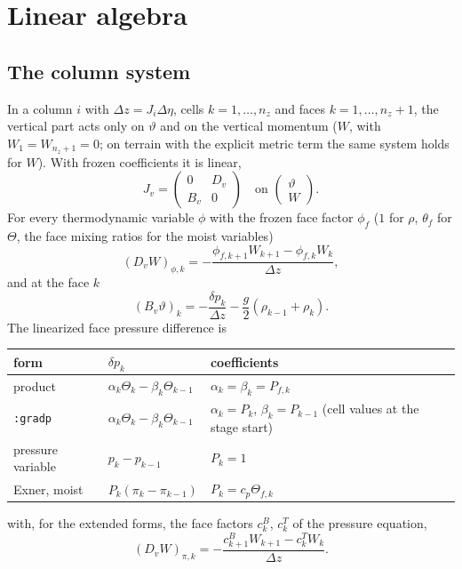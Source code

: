 \documentclass[11pt,a4paper]{article}
\newcommand{\code}[1]{\texttt{\small #1}}
\newcommand{\tv}{\vartheta}   %
\begin{document}
\section{Linear algebra}\label{sec:la}
\subsection{The column system}\label{sec:col}
In a column $i$ with $\Delta z=J_i\Delta\eta$, cells $k=1,\dots,n_z$ and faces $k=1,\dots,n_z+1$, the vertical part acts only
on $\tv$ and on the vertical momentum ($W$, with $W_1=W_{n_z+1}=0$; on terrain with the explicit metric term the
same system holds for $W$). With frozen coefficients it is linear,
\[
J_v=\begin{pmatrix}0&D_v\\ B_v&0\end{pmatrix}\quad\text{on }\begin{pmatrix}\tv\\W\end{pmatrix}.
\]
For every thermodynamic variable $\phi$ with the frozen face factor $\phi_f$ ($1$ for $\rho$, $\theta_f$ for $\Theta$, the face
mixing ratios for the moist variables)
\[
(D_vW)_{\phi,k}=-\frac{\phi_{f,k+1}W_{k+1}-\phi_{f,k}W_k}{\Delta z},
\]
and at the face $k$
\[
(B_v\tv)_k=-\frac{\delta p_k}{\Delta z}-\frac g2(\rho_{k-1}+\rho_k) .
\]
The linearized face pressure difference is
\begin{center}\small
\begin{tabular}{lll}\toprule
form & $\delta p_k$ & coefficients\\\midrule
product & $\alpha_k\Theta_k-\beta_k\Theta_{k-1}$ & $\alpha_k=\beta_k=P_{f,k}$\\
\code{:gradp} & $\alpha_k\Theta_k-\beta_k\Theta_{k-1}$ & $\alpha_k=P_k$, $\beta_k=P_{k-1}$ (cell values at the stage start)\\
pressure variable & $p_k-p_{k-1}$ & $P_k=1$\\
Exner, moist & $P_k(\pi_k-\pi_{k-1})$ & $P_k=c_p\Theta_{f,k}$\\\bottomrule
\end{tabular}
\end{center}
with, for the extended forms, the face factors $c^B_k$, $c^T_k$ of the pressure equation,
\[
(D_vW)_{\pi,k}=-\frac{c^B_{k+1}W_{k+1}-c^T_kW_k}{\Delta z} .
\]
\end{document}
